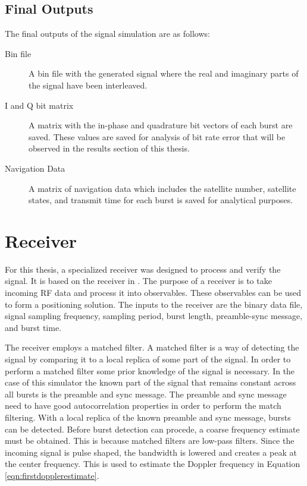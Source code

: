 \documentclass[12pt]{report}
\begin{document}
\subsection{Final Outputs}
The final outputs of the signal simulation are as follows:
\begin{description}
    \item[Bin file] A bin file with the generated signal where the real and imaginary parts of the signal have been interleaved.
    \item[I and Q bit matrix] A matrix with the in-phase and quadrature bit vectors of each burst are saved. These values are saved for analysis of bit rate error that will be observed in the results section of this thesis.
    \item[Navigation Data] A matrix of navigation data which includes the satellite number, satellite states, and transmit time for each burst is saved for analytical purposes.
\end{description}

\section{Receiver}\label{sec:receiver}
For this thesis, a specialized receiver was designed to process and verify the signal. It is based on the receiver in \cite{samuel_mcdougal_single-antenna_2022}. The purpose of a receiver is to take incoming RF data and process it into observables. These observables can be used to form a positioning solution. The inputs to the receiver are the binary data file, signal sampling frequency, sampling period, burst length, preamble-sync message, and burst time.

The receiver employs a matched filter. A matched filter is a way of detecting the signal by comparing it to a local replica of some part of the signal. In order to perform a matched filter some prior knowledge of the signal is necessary. In the case of this simulator the known part of the signal that remains constant across all bursts is the preamble and sync message. The preamble and sync message need to have good autocorrelation properties in order to perform the match filtering. With a local replica of the known preamble and sync message, bursts can be detected. Before burst detection can procede, a coarse frequency estimate must be obtained. This is because matched filters are low-pass filters. Since the incoming signal is pulse shaped, the bandwidth is lowered and creates a peak at the center frequency. This is used to estimate the Doppler frequency in Equation \ref{eqn:firstdopplerestimate}.
\end{document}

